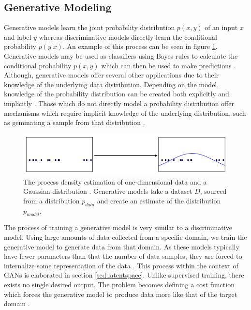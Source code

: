 \documentclass[11pt]{article}
\begin{document}
\subsection{Generative Modeling}
Generative models learn the joint probability distribution $p(x,y)$ of an input $x$ and label $y$ whereas discriminative models directly learn the conditional probability $p(y|x)$. An example of this process can be seen in figure \ref{fig:pdf}. Generative models may be used as classifiers using Bayes rules to calculate the conditional probability $p(x,y)$ which can then be used to make predictions \citep{NIPS2001_2020}. Although, generative models offer several other applications due to their knowledge of the underlying data distribution. Depending on the model, knowledge of the probability distribution can be created both explicitly and implicitly \citep{Goodfellow-et-al-2016}. Those which do not directly model a probability distribution offer mechanisms which require implicit knowledge of the underlying distribution, such as geminating a sample from that distribution \citep{Goodfellow-et-al-2016}.

\begin{figure}
\centering
\includegraphics[scale=0.7]{pdf}
\caption{The process density estimation of one-dimensional data and a Gaussian distribution \citep{2017arXiv170100160G}. Generative models take a dataset $D$, sourced from a distribution $p_{data}$ and create an estimate of the distribution $p_{model}$.}
\label{fig:pdf}
\end{figure}

The process of training a generative model is very similar to a discriminative model. Using large amounts of data collected from a specific domain, we train the generative model to generate data from that domain. As these models typically have fewer parameters than that the number of data samples, they are forced to internalize some representation of the data \citep{genmodelingopenai}. This process within the context of GANs is elaborated in section \ref{sed:latentspace}. Unlike supervised training, there exists no single desired output. The problem becomes defining a cost function which forces the generative model to produce data more like that of the target domain \citep{genmodelingopenai}.
\end{document}

